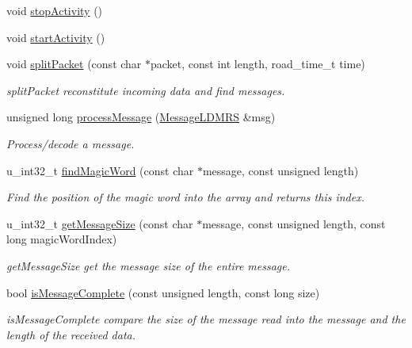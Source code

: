 \begin{DoxyCompactItemize}
\item 
void \hyperlink{classpacpus_1_1SickLDMRSSensor_a5b3674df80e98093692fac9643819ab5}{stop\-Activity} ()
\item 
void \hyperlink{classpacpus_1_1SickLDMRSSensor_a2b82c6f677fe7e7e712b7397fb5390ee}{start\-Activity} ()
\item 
void \hyperlink{classpacpus_1_1SickLDMRSSensor_a5a3dd4f58b4d43fed06ff28db5822d5d}{split\-Packet} (const char $\ast$packet, const int length, road\-\_\-time\-\_\-t time)
\begin{DoxyCompactList}\small\item\em split\-Packet reconstitute incoming data and find messages. \end{DoxyCompactList}\item 
unsigned long \hyperlink{classpacpus_1_1SickLDMRSSensor_a01d9dc51e9220f828cb3651cf8b21e09}{process\-Message} (\hyperlink{classpacpus_1_1MessageLDMRS}{Message\-L\-D\-M\-R\-S} \&msg)
\begin{DoxyCompactList}\small\item\em Process/decode a message. \end{DoxyCompactList}\item 
u\-\_\-int32\-\_\-t \hyperlink{classpacpus_1_1SickLDMRSSensor_a223429320a452ab8bd50ec2b11691f91}{find\-Magic\-Word} (const char $\ast$message, const unsigned length)
\begin{DoxyCompactList}\small\item\em Find the position of the magic word into the array and returns this index. \end{DoxyCompactList}\item 
u\-\_\-int32\-\_\-t \hyperlink{classpacpus_1_1SickLDMRSSensor_ae128ee5ba4b2800822b9776a3001b999}{get\-Message\-Size} (const char $\ast$message, const unsigned length, const long magic\-Word\-Index)
\begin{DoxyCompactList}\small\item\em get\-Message\-Size get the message size of the entire message. \end{DoxyCompactList}\item 
bool \hyperlink{classpacpus_1_1SickLDMRSSensor_a1032c614191b0bbd9a5d2c36f362e70b}{is\-Message\-Complete} (const unsigned length, const long size)
\begin{DoxyCompactList}\small\item\em is\-Message\-Complete compare the size of the message read into the message and the length of the received data. \end{DoxyCompactList}\end{DoxyCompactItemize}
